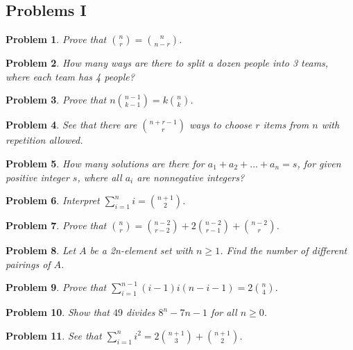 \documentclass[11pt,a5paper]{article}
\newtheorem{problem}{Problem}
\begin{document}
\subsection*{Problems I}

\begin{problem}
Prove that ${n \choose r} = {n \choose n - r}$.
\end{problem}

\begin{problem}
How many ways are there to split a dozen people into 3 teams, where each team has 4 people?
\end{problem}

\begin{problem}
Prove that $n{n-1 \choose k-1}= k{n \choose k}$.
\end{problem}

\begin{problem}
See that there are ${n+r-1 \choose r}$ ways to choose $r$ items from $n$ with repetition allowed.
\end{problem}

\begin{problem}
How many solutions are there for $a_1 + a_2 + \dots + a_n = s$, for given positive integer $s$, where all $a_i$ are nonnegative integers?
\end{problem}

\begin{problem}
Interpret $\sum_{i=1}^{n} i = {n+1 \choose 2}$.
\end{problem}

\begin{problem}
Prove that ${n \choose r} = {n - 2 \choose r - 2} + 2{n - 2 \choose r - 1} + {n - 2 \choose r}$.
\end{problem}

\begin{problem}
Let $A$ be a \textit{2n}-element set with $n \ge 1$. Find the number of different pairings of $A$.
\end{problem}

\begin{problem}
Prove that $\sum_{i=1}^{n-1} (i - 1)i(n-i-1) = 2{n \choose 4}$.
\end{problem}

\begin{problem}
Show that $49$ divides $8^n - 7n - 1$ for all $n \ge 0$.
\end{problem}

\begin{problem}
See that $\sum_{i=1}^n i^2 = 2 {n+1 \choose 3} + {n+1\choose 2}$.
\end{problem}
\end{document}
